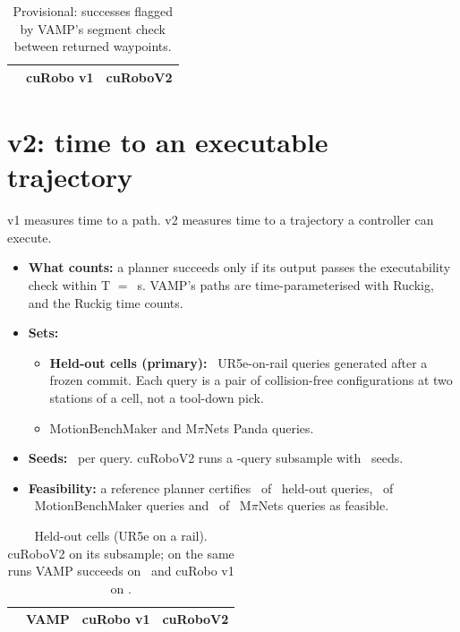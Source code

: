 \documentclass[11pt]{article}
\begin{document}
\begin{table}[ht]\centering\footnotesize
\caption{Provisional: successes flagged by VAMP's segment check between returned waypoints.}\label{tab:flag}
\begin{tabular}{@{}lcc@{}}\toprule
 & cuRobo v1 & cuRoboV2 \\\midrule
\end{tabular}
\end{table}

\section{v2: time to an executable trajectory}
\label{sec:v2}
v1 measures time to a path. v2 measures time to a trajectory a controller can execute.
\begin{itemize}
  \item \textbf{What counts:} a planner succeeds only if its output passes the executability check within T $=$ \budget\,s. VAMP's paths are time-parameterised with Ruckig, and the Ruckig time counts.
  \item \textbf{Sets:}
  \begin{itemize}
    \item \textbf{Held-out cells (primary):} \vTwoQueries\ UR5e-on-rail queries generated after a frozen commit. Each query is a pair of collision-free configurations at two stations of a cell, not a tool-down pick.
    \item MotionBenchMaker and M$\pi$Nets Panda queries.
  \end{itemize}
  \item \textbf{Seeds:} \vTwoSeeds\ per query. cuRoboV2 runs a \vTwoSubQ-query subsample with \vTwoSubSeeds\ seeds.
  \item \textbf{Feasibility:} a reference planner certifies \feasA\ of \feasQA\ held-out queries, \feasMbm\ of \feasQMbm\ MotionBenchMaker queries and \feasMpi\ of \feasQMpi\ M$\pi$Nets queries as feasible.
\end{itemize}

\begin{table}[ht]\centering\footnotesize
\caption{Held-out cells (UR5e on a rail). cuRoboV2 on its subsample; on the same runs VAMP succeeds on \aSubVamp\ and cuRobo v1 on \aSubVOne.}\label{tab:v2}
\begin{tabular}{@{}l ccc@{}}\toprule
 & VAMP & cuRobo v1 & cuRoboV2 \\\midrule
\end{tabular}
\end{table}
\end{document}
